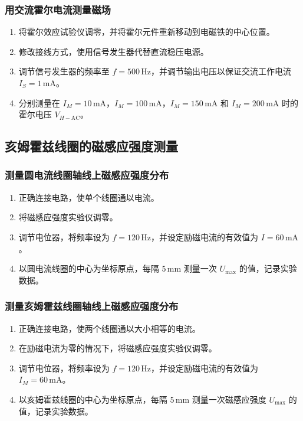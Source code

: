 \documentclass[UTF-8,twoside,cs4size]{ctexart}
\begin{document}
\subsubsection{用交流霍尔电流测量磁场}
\begin{enumerate}
    \item 将霍尔效应试验仪调零，并将霍尔元件重新移动到电磁铁的中心位置。\par
    \item 修改接线方式，使用信号发生器代替直流稳压电源。\par
    \item 调节信号发生器的频率至 $f = 500 \, \mathrm{Hz}$，并调节输出电压以保证交流工作电流 $I_S = 1 \, \mathrm{mA}$。\par
    \item 分别测量在 $I_M = 10 \, \mathrm{mA}$，$I_M = 100 \, \mathrm{mA}$，$I_M = 150 \, \mathrm{mA}$ 和 $I_M = 200 \, \mathrm{mA}$ 时的霍尔电压 $V_{H-\mathrm{AC}}$。\par
\end{enumerate}
\subsection{亥姆霍兹线圈的磁感应强度测量}
\subsubsection{测量圆电流线圈轴线上磁感应强度分布}
\begin{enumerate}
    \item 正确连接电路，使单个线圈通以电流。\par
    \item 将磁感应强度实验仪调零。\par
    \item 调节电位器，将频率设为 $f = 120 \, \mathrm{Hz}$，并设定励磁电流的有效值为 $I = 60 \, \mathrm{mA}$。\par
    \item 以圆电流线圈的中心为坐标原点，每隔 $5 \, \mathrm{mm}$ 测量一次 $U_{\max}$ 的值，记录实验数据。\par
\end{enumerate}

\subsubsection{测量亥姆霍兹线圈轴线上磁感应强度分布}
\begin{enumerate}
    \item 正确连接电路，使两个线圈通以大小相等的电流。\par
    \item 在励磁电流为零的情况下，将磁感应强度实验仪调零。\par
    \item 调节电位器，将频率设为 $f = 120 \, \mathrm{Hz}$，并设定励磁电流的有效值为 $I_M = 60 \, \mathrm{mA}$。\par
    \item 以亥姆霍兹线圈的中心为坐标原点，每隔 $5 \, \mathrm{mm}$ 测量一次磁感应强度 $U_{\max}$ 的值，记录实验数据。\par
\end{enumerate}
\end{document}
